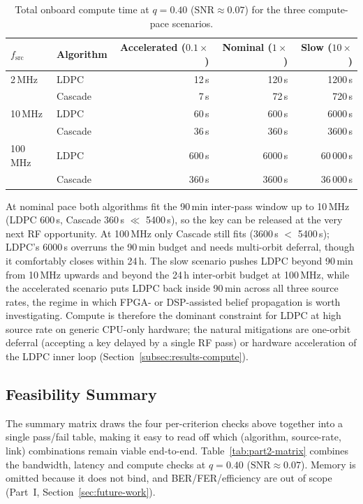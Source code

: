 \documentclass{UoYCSproject}
\begin{document}
\begin{table}[H]
    \centering
    \small
    \begin{tabular}{llrrr}
        \toprule
        $f_{\text{src}}$ & Algorithm & Accelerated ($0.1\times$) & Nominal ($1\times$) & Slow ($10\times$)\\
        \midrule
        2\,MHz   & LDPC    & 12\,s   & 120\,s   & 1200\,s   \\
                 & Cascade & 7\,s    & 72\,s    & 720\,s    \\
        10\,MHz  & LDPC    & 60\,s   & 600\,s   & 6000\,s   \\
                 & Cascade & 36\,s   & 360\,s   & 3600\,s   \\
        100\,MHz & LDPC    & 600\,s  & 6000\,s  & 60\,000\,s \\
                 & Cascade & 360\,s  & 3600\,s  & 36\,000\,s \\
        \bottomrule
    \end{tabular}
    \caption{Total onboard compute time at $q = 0.40$
    ($\mathrm{SNR}\!\approx\!0.07$) for the three compute-pace scenarios.}
    \label{tab:part2-compute}
\end{table}

At nominal pace both algorithms fit the 90\,min inter-pass window up to
10\,MHz (LDPC 600\,s, Cascade 360\,s $\ll$ 5400\,s), so the key can be
released at the very next RF opportunity. At 100\,MHz only Cascade still
fits (3600\,s $<$ 5400\,s); LDPC's 6000\,s overruns the 90\,min budget
and needs multi-orbit deferral, though it comfortably closes within 24\,h.
The slow scenario pushes LDPC beyond 90\,min from 10\,MHz upwards and
beyond the 24\,h inter-orbit budget at 100\,MHz, while the accelerated
scenario puts LDPC back inside 90\,min across all three source rates,
the regime in which FPGA- or DSP-assisted belief propagation is worth
investigating. Compute is therefore the dominant constraint for LDPC at
high source rate on generic CPU-only hardware; the natural mitigations
are one-orbit deferral (accepting a key delayed by a single RF pass) or
hardware acceleration of the LDPC inner loop
(Section~\ref{subsec:results-compute}).

\subsection{Feasibility Summary}
\label{subsec:results-feasibility-matrix}

The summary matrix draws the four per-criterion checks above together
into a single pass/fail table, making it easy to read off which
(algorithm, source-rate, link) combinations remain viable end-to-end.
Table~\ref{tab:part2-matrix} combines the bandwidth, latency and compute
checks at $q = 0.40$ ($\mathrm{SNR}\!\approx\!0.07$). Memory is omitted
because it does not bind, and BER/FER/efficiency are out of scope (Part~I,
Section~\ref{sec:future-work}).
\end{document}
